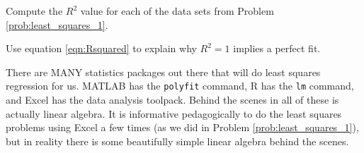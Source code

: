 \begin{problem}
    Compute the $R^2$ value for each of the data sets from Problem
    \ref{prob:least_squares_1}.
\end{problem}

\begin{problem}
    Use equation \eqref{eqn:Rsquared} to explain why $R^2=1$ implies a perfect fit.
\end{problem}

There are MANY statistics packages out there that will do least squares regression for us.
MATLAB has the \texttt{polyfit} command, R has the \texttt{lm} command, and Excel has the
data analysis toolpack.  Behind the scenes in all of these is actually linear algebra.  It
is informative pedagogically to do the least squares problems using Excel a few times (as
we did in Problem \ref{prob:least_squares_1}), but in reality there is some beautifully
simple linear algebra behind the scenes.

